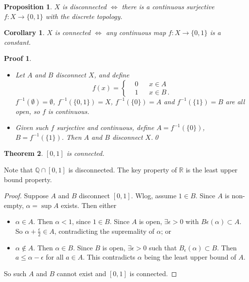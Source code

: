 \documentclass{article}
\theoremstyle{plain}\theoremheaderfont{\normalfont\itshape}\theorembodyfont{\rmfamily}\theoremseparator{.}\newtheorem*{rem}{Remark}\newtheorem*{ex}{Example}\newtheorem*{proof}{Proof}\newtheorem*{altp}{Alternative proof}
\theoremstyle{plain}\theoremheaderfont{\normalfont\bfseries}\theorembodyfont{\rmfamily}\theoremseparator{.}\newtheorem{thm}{Theorem}[section]\newtheorem{lem}[thm]{Lemma}\newtheorem{prop}[thm]{Proposition}\newtheorem*{cor}{Corollary}\newtheorem{defn}[thm]{Definition}\newtheorem{clm}[thm]{Claim}\newtheorem{clminproof}{Claim}
\theoremstyle{break}\theoremheaderfont{\normalfont\itshape}\theorembodyfont{\rmfamily}\theoremseparator{.\medskip}\newtheorem*{proofskip}{Proof}\newtheorem*{exs}{Examples}\newtheorem*{rems}{Remarks}
\theoremstyle{break}\theoremheaderfont{\normalfont\bfseries}\theorembodyfont{\rmfamily}\theoremseparator{.\medskip}\newtheorem{lemskip}[thm]{Lemma}\newtheorem{defnskip}[thm]{Definition}\newtheorem{propskip}[thm]{Proposition}\newtheorem{thmskip}[thm]{Theorem}
\newcommand{\qed}{\hfill\ensuremath{\Box}}
\begin{document}
    \begin{prop}
        \(X\) is disconnected \(\iff\) there is a continuous surjective \(f:X\to\{0,1\}\) with the discrete topology.
    \end{prop}

    \begin{cor}
        \(X\) is connected \(\iff\) any continuous map \(f:X\to\{0,1\}\) is a constant.
    \end{cor}
    \begin{proofskip}
        \begin{itemize}
            \item[(\(\Rightarrow\))] Let \(A\) and \(B\) disconnect \(X\), and define
            \[f(x)=\left\{\begin{aligned}
                &0 && x\in A\\
                &1 && x\in B\,.
            \end{aligned}\right.\]
            \(f^{-1}(\emptyset)=\emptyset\), \(f^{-1}(\{0,1\})=X\), \(f^{-1}(\{0\})=A\) and \(f^{-1}(\{1\})=B\) are all open, so \(f\) is continuous.
            \item[(\(\Leftarrow\))] Given such \(f\) surjective and continuous, define \(A=f^{-1}(\{0\})\), \(B=f^{-1}(\{1\})\). Then \(A\) and \(B\) disconnect \(X\).\qed
        \end{itemize}
    \end{proofskip}

    \begin{thm}
        \([0,1]\) is connected.
    \end{thm}
    Note that \(\mathbb{Q}\cap[0,1]\) is disconnected. The key property of \(\mathbb{R}\) is the least upper bound property.
    \begin{proof}
        Suppose \(A\) and \(B\) disconnect \([0,1]\). Wlog, assume \(1\in B\). Since \(A\) is non-empty, \(\alpha=\sup A\) exists. Then either
        \begin{itemize}[topsep=0pt]
            \item \(\alpha\in A\). Then \(\alpha<1\), since \(1\in B\). Since \(A\) is open, \(\exists\epsilon>0\) with \(B\epsilon(\alpha)\subset A\). So \(\alpha+\frac{\epsilon}{2}\in A\), contradicting the supremality of \(\alpha\); or
            \item \(\alpha\not\in A\). Then \(\alpha\in B\). Since \(B\) is open, \(\exists\epsilon>0\) such that \(B_\epsilon(\alpha)\subset B\). Then \(a\le\alpha-\epsilon\) for all \(a\in A\). This contradicts \(\alpha\) being the least upper bound of \(A\).
        \end{itemize}
        So such \(A\) and \(B\) cannot exist and \([0,1]\) is connected.
    \end{proof}
\end{document}
